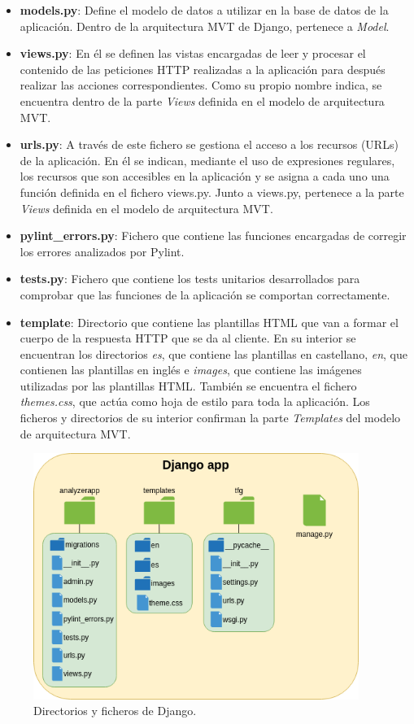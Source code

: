 \documentclass[a4paper, 12pt]{book}
\begin{document}
\begin{itemize}
	\item \textbf{models.py}: Define el modelo de datos a utilizar en la base de datos de la aplicación. Dentro de la arquitectura MVT de Django, pertenece a \textit{Model}.
	\item \textbf{views.py}: En él se definen las vistas encargadas de leer y procesar el contenido de las peticiones HTTP realizadas a la aplicación para después realizar las acciones correspondientes.
	Como su propio nombre indica, se encuentra dentro de la parte \textit{Views} definida en el modelo de arquitectura MVT.
	\item \textbf{urls.py}: A través de este fichero se gestiona el acceso a los recursos (URLs) de la aplicación.
	En él se indican, mediante el uso de expresiones regulares, los recursos que son accesibles en la aplicación y se asigna a cada uno una función definida en el fichero views.py. Junto a views.py, pertenece a la parte \textit{Views} definida en el modelo de arquitectura MVT.
	\item \textbf{pylint\_errors.py}: Fichero que contiene las funciones encargadas de corregir los errores analizados por Pylint.
	\item \textbf{tests.py}: Fichero que contiene los tests unitarios desarrollados para comprobar que las funciones de la aplicación se comportan correctamente.
	\item \textbf{template}: Directorio que contiene las plantillas HTML que van a formar el cuerpo de la respuesta HTTP que se da al cliente. En su interior se encuentran los directorios \textit{es}, que contiene las plantillas en castellano, \textit{en}, que contienen las plantillas en inglés e \textit{images}, que contiene las imágenes utilizadas por las plantillas HTML. También se encuentra el fichero \textit{themes.css}, que actúa como hoja de estilo para toda la aplicación. Los ficheros y directorios de su interior confirman la parte \textit{Templates} del modelo de arquitectura MVT.
\end{itemize}

\begin{figure}
  \centering
  \includegraphics[height=8cm, keepaspectratio]{img/directorios.png}
  \caption{Directorios y ficheros de Django.}\label{fig:directorios}
\end{figure}
\end{document}
